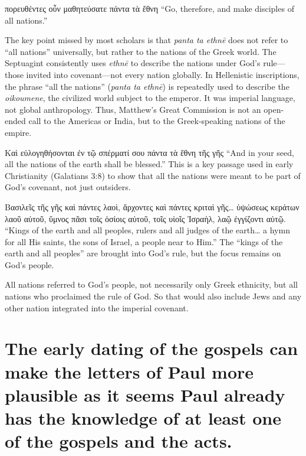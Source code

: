 \hfuzz=5pt %

πορευθέντες οὖν μαθητεύσατε πάντα τὰ ἔθνη ``Go, therefore, and make disciples of all nations.''

The key point missed by most scholars is that \textit{panta ta ethnē} does not refer to ``all nations'' universally, but rather to the nations of the Greek world.
The Septuagint consistently uses \textit{ethnē} to describe the nations under God's rule---those invited into covenant---not every nation globally.
In Hellenistic inscriptions, the phrase ``all the nations'' (\textit{panta ta ethnē}) is repeatedly used to describe the \textit{oikoumene}, the civilized world subject to the emperor.
It was imperial language, not global anthropology.
Thus, Matthew’s Great Commission is not an open-ended call to the Americas or India, but to the Greek-speaking nations of the empire.

Καὶ εὐλογηθήσονται ἐν τῷ σπέρματί σου πάντα τὰ ἔθνη τῆς γῆς ``And in your seed, all the nations of the earth shall be blessed.''
This is a key passage used in early Christianity (Galatians 3:8) to show that all the nations were meant to be part of God's covenant, not just outsiders.

Βασιλεῖς τῆς γῆς καὶ πάντες λαοὶ, ἄρχοντες καὶ πάντες κριταὶ γῆς\ldots{} ὑψώσεως κεράτων λαοῦ αὐτοῦ, ὕμνος πᾶσι τοῖς ὁσίοις αὐτοῦ, τοῖς υἱοῖς Ἰσραὴλ, λαῷ ἐγγίζοντι αὐτῷ.
``Kings of the earth and all peoples, rulers and all judges of the earth\ldots{} a hymn for all His saints, the sons of Israel, a people near to Him.''
The ``kings of the earth and all peoples'' are brought into God's rule, but the focus remains on God's people.

All nations referred to God's people, not necessarily only Greek ethnicity, but all nations who proclaimed the rule of God.
So that would also include Jews and any other nation integrated into the imperial covenant.

\section{The early dating of the gospels can make the letters of Paul more plausible as it seems Paul already has the knowledge of at least one of the gospels and the acts.}\label{sec:the-early-dating-of-the-gospels-can-make-the-letters-of-paul-more-plausible-as-it-seems-paul-already-has-the-knowledge-of-at-least-one-of-the-gospels-and-the-acts.}

